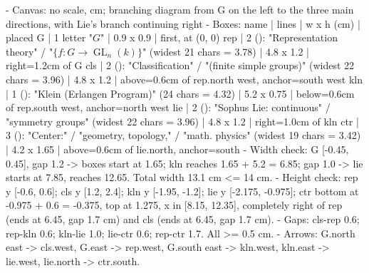 \begin{content}
\begin{hidden}
- Canvas: no scale, cm; branching diagram from G on the left to the three main directions, with Lie's branch continuing right
- Boxes: name | lines | w x h (cm) | placed
  G      | 1 letter "$G$" | 0.9 x 0.9 | first, at (0, 0)
  rep    | 2 (\small): "Representation theory" / "$\{f \colon G \to \operatorname{GL}_n(k)\}$" (widest 21 chars = 3.78) | 4.8 x 1.2 | right=1.2cm of G
  cls    | 2 (\small): "Classification" / "(finite simple groups)" (widest 22 chars = 3.96) | 4.8 x 1.2 | above=0.6cm of rep.north west, anchor=south west
  kln    | 1 (\small): "Klein (Erlangen Program)" (24 chars = 4.32) | 5.2 x 0.75 | below=0.6cm of rep.south west, anchor=north west
  lie    | 2 (\small): "Sophus Lie: continuous" / "symmetry groups" (widest 22 chars = 3.96) | 4.8 x 1.2 | right=1.0cm of kln
  ctr    | 3 (\small): "Center:" / "geometry, topology," / "math. physics" (widest 19 chars = 3.42) | 4.2 x 1.65 | above=0.6cm of lie.north, anchor=south
- Width check: G [-0.45, 0.45], gap 1.2 -> boxes start at 1.65; kln reaches 1.65 + 5.2 = 6.85; gap 1.0 -> lie starts at 7.85, reaches 12.65. Total width 13.1 cm <= 14 cm.
- Height check: rep y [-0.6, 0.6]; cls y [1.2, 2.4]; kln y [-1.95, -1.2]; lie y [-2.175, -0.975]; ctr bottom at -0.975 + 0.6 = -0.375, top at 1.275, x in [8.15, 12.35], completely right of rep (ends at 6.45, gap 1.7 cm) and cls (ends at 6.45, gap 1.7 cm).
- Gaps: cls-rep 0.6; rep-kln 0.6; kln-lie 1.0; lie-ctr 0.6; rep-ctr 1.7. All >= 0.5 cm.
- Arrows: G.north east -> cls.west, G.east -> rep.west, G.south east -> kln.west, kln.east -> lie.west, lie.north -> ctr.south.
\end{hidden}
\begin{center}
\end{center}
\end{content}
